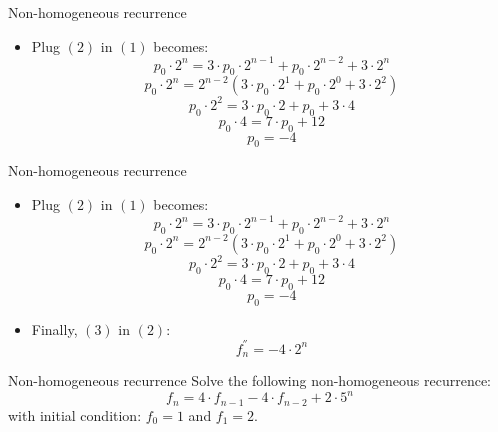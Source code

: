 \documentclass{beamer}
\begin{document}
\begin{frame}{Non-homogeneous recurrence}
   \begin{itemize}
        \item Plug $(2)$ in $(1)$ becomes:
            $$ p_0 \cdot 2^n = 3 \cdot p_0 \cdot 2^{n-1} + p_0 \cdot 2^{n-2} + 3 \cdot 2^n $$
            $$ p_0 \cdot 2^n = 2^{n-2}( 3 \cdot p_0 \cdot 2^{1} + p_0 \cdot 2^{0} + 3 \cdot 2^2) $$
            $$ p_0 \cdot 2^2 = 3 \cdot p_0 \cdot 2 + p_0 + 3 \cdot 4 $$
            $$ p_0 \cdot 4 = 7 \cdot p_0 + 12 $$
            \begin{equation}\tag{3}
                p_0 = -4
            \end{equation}
      \end{itemize}
\end{frame}

\begin{frame}{Non-homogeneous recurrence}
   \begin{itemize}
        \item Plug $(2)$ in $(1)$ becomes:
            $$ p_0 \cdot 2^n = 3 \cdot p_0 \cdot 2^{n-1} + p_0 \cdot 2^{n-2} + 3 \cdot 2^n $$
            $$ p_0 \cdot 2^n = 2^{n-2}( 3 \cdot p_0 \cdot 2^{1} + p_0 \cdot 2^{0} + 3 \cdot 2^2) $$
            $$ p_0 \cdot 2^2 = 3 \cdot p_0 \cdot 2 + p_0 + 3 \cdot 4 $$
            $$ p_0 \cdot 4 = 7 \cdot p_0 + 12 $$
            \begin{equation}\tag{3}
                p_0 = -4
            \end{equation}
        \item Finally, $(3)$ in $(2)$:
            $$ f_n^{''} = -4 \cdot 2^n $$
      \end{itemize}
\end{frame}

\begin{frame}{Non-homogeneous recurrence}
    Solve the following non-homogeneous recurrence:
    \begin{equation}\tag{1}
        f_n = 4 \cdot f_{n-1} - 4 \cdot f_{n-2} + 2 \cdot 5^n
    \end{equation}
    with initial condition: $f_0 = 1$ and $f_1 = 2$.
\end{frame}
\end{document}
